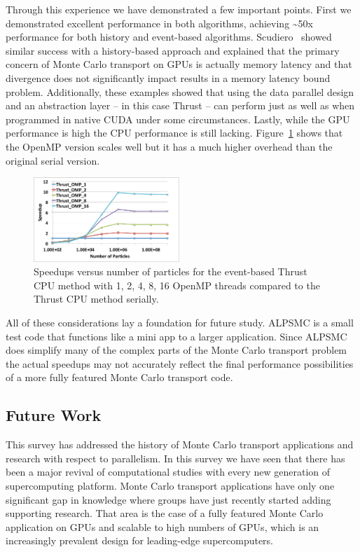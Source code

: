 Through this experience we have demonstrated a few important points.
%
First we demonstrated excellent performance in both algorithms, achieving \textasciitilde50x performance for both history and event-based algorithms.
%
Scudiero~\cite{tonyScudiero} showed similar success with a history-based approach and explained that the primary concern of Monte Carlo transport on GPUs is actually memory latency and that divergence does not significantly impact results in a memory latency bound problem.
%
Additionally, these examples showed that using the data parallel design and an abstraction layer -- in this case Thrust -- can perform just as well as when programmed in native CUDA under some circumstances. 
%
Lastly, while the GPU performance is high the CPU performance is still lacking.
%
Figure~\ref{fig:OMPScale} shows that the OpenMP version scales well but it has a much higher overhead than the original serial version.

\begin{figure}
\includegraphics[width=0.49\textwidth]{thrustOMPSpeedup.pdf}
\caption{Speedups versus number of particles for the event-based Thrust CPU method with 1, 2, 4, 8, 16 OpenMP threads compared to the Thrust CPU method serially.~\cite{alpsmc2}}
\label{fig:OMPScale}
\end{figure}

All of these considerations lay a foundation for future study.
%
ALPSMC is a small test code that functions like a mini app to a larger application.
%
Since ALPSMC does simplify many of the complex parts of the Monte Carlo transport problem the actual speedups may not accurately reflect the final performance possibilities of a more fully featured Monte Carlo transport code.
%

\subsection{\textbf{Future Work}}

This survey has addressed the history of Monte Carlo transport applications and research with respect to parallelism.
%
In this survey we have seen that there has been a major revival of computational studies with every new generation of supercomputing platform.
%
Monte Carlo transport applications have only one significant gap in knowledge where groups have just recently started adding supporting research.
%
That area is the case of a fully featured Monte Carlo application on GPUs and scalable to high numbers of GPUs, which is an increasingly prevalent design for leading-edge supercomputers.

